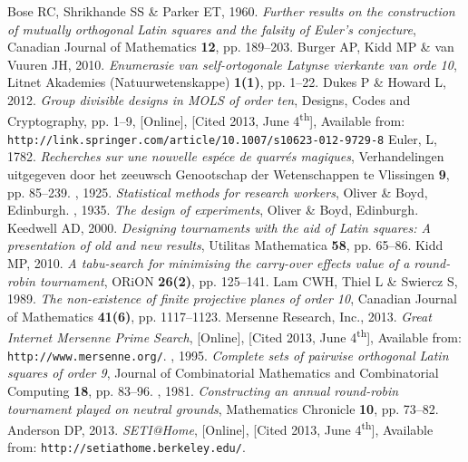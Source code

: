 \documentclass[11pt, a4paper]{article}
\newcounter{ls}
\begin{document}
 {\footnotesize
\begin{thebibliography}{xx}
 {{\sc  Bose RC,    Shrikhande SS \&  Parker ET}, 1960. {\em Further results on the construction of mutually orthogonal Latin squares and the falsity of Euler's conjecture}, Canadian  Journal of  Mathematics {\bf 12}, pp. 189--203.}
 {{\sc  Burger AP, Kidd MP \&  van Vuuren JH}, 2010. {\em Enumerasie van self-ortogonale Latynse vierkante van orde 10}, Litnet Akademies (Natuurwetenskappe) {\bf 1(1)}, pp. 1--22.}
 {{\sc  Dukes P  \& Howard L}, 2012. {\em Group divisible designs in MOLS of order ten}, Designs, Codes and Cryptography,  pp. 1--9, [Online], [Cited 2013, June 4\textsuperscript{th}], Available from: {\tt http://link.springer.com/article/10.1007/s10623-012-9729-8}}
 {{\sc Euler, L}, 1782. {\em Recherches sur une nouvelle esp\'ece de quarr\'es magiques}, Verhandelingen uitgegeven door het zeeuwsch Genootschap der Wetenschappen te Vlissingen {\bf 9}, pp. 85--239.}
, 1925. {\em Statistical methods for research workers}, Oliver \& Boyd, Edinburgh.
, 1935. {\em The design of experiments}, Oliver \& Boyd, Edinburgh.
 {{\sc Keedwell AD}, 2000. {\em Designing tournaments with the aid of Latin squares: A presentation of old and new results}, Utilitas Mathematica {\bf 58}, pp. 65--86.}
 {{\sc Kidd MP}, 2010. {\em A tabu-search for minimising the carry-over effects value of a round-robin tournament}, ORiON {\bf 26(2)}, pp. 125--141.}
 {{\sc  Lam CWH, Thiel L \& Swiercz S}, 1989. {\em The non-existence of finite projective planes of order 10}, Canadian  Journal of  Mathematics {\bf 41(6)}, pp. 1117--1123.}
 {\sc Mersenne Research, Inc.}, 2013. {\em Great Internet Mersenne Prime Search},   [Online], [Cited 2013, June 4\textsuperscript{th}], Available from: {\tt http://www.mersenne.org/}.
, 1995. {\em Complete sets of pairwise orthogonal Latin squares of order 9}, Journal of Combinatorial Mathematics and Combinatorial Computing {\bf 18}, pp. 83--96.
, 1981. {\em Constructing an annual round-robin tournament played on neutral grounds}, Mathematics Chronicle {\bf 10}, pp. 73--82.
 {\sc Anderson DP}, 2013. {\em SETI@Home},    [Online], [Cited 2013, June 4\textsuperscript{th}], Available from: {\tt http://setiathome.berkeley.edu/}.
 
\end{thebibliography}}



\end{document}
